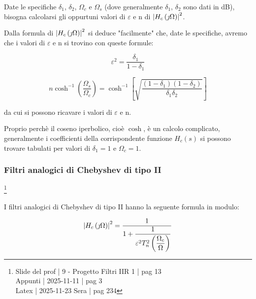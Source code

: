 Date le specifiche $\delta_1$, $\delta_2$, $\Omega_c$ e $\Omega_s$ (dove generalmente $\delta_1$, $\delta_2$ sono dati in dB), 
bisogna calcolarsi gli oppurtuni valori di $\varepsilon$ e n di $\abs{H_c \left(\jmath \Omega\right)}^{2}$. \newline 

Dalla formula di $\abs{H_c \left(\jmath \Omega\right)}^{2}$ si deduce "facilmente" che, date le specifiche, avremo che i valori di $\varepsilon$ e n si trovino con queste formule: 

{
    \Large 
    \begin{equation}
        \varepsilon^{2}
        = 
        \dfrac{\delta_1}{1 - \delta_1}
    \end{equation}
}


{
    \Large 
    \begin{equation}
        n \cosh^{-1} \left(\dfrac{\Omega_s}{\Omega_c}\right)
        = 
        \cosh^{-1} \left[ 
            \sqrt{
                \dfrac{\left(1 - \delta_1\right) \left(1 - \delta_2\right) }{\delta_1 \delta_2}
            }
        \right]
    \end{equation}
}

da cui si possono ricavare i valori di $\varepsilon$ e n. \newline 

Proprio perchè il coseno iperbolico, cioè $\cosh$, è un calcolo complicato, generalmente i coefficienti della corrispondente funzione $H_c \left(s\right)$ si possono trovare 
tabulati per valori di $\delta_1 = 1$ e $\Omega_c = 1$. \newline 

\newpage 

\subsubsection{Filtri analogici di Chebyshev di tipo II}

\footnote{ 
    Slide del prof | 9 - Progetto Filtri IIR 1 | pag 13\\ 
    Appunti | 2025-11-11 | pag 3  \\ 
    Latex | 2025-11-23 Sera | pag 234 
} 

I filtri analogici di Chebyshev di tipo II hanno la seguente formula in modulo: 

{
    \Large 
    \begin{equation}
        \abs{H_c \left(\jmath \Omega\right)}^{2}
        = 
        \dfrac{1}{1 + \dfrac{1}{\varepsilon^{2} T^{2}_{n} \left(\dfrac{\Omega_c}{\Omega}\right)}}
    \end{equation}
}

